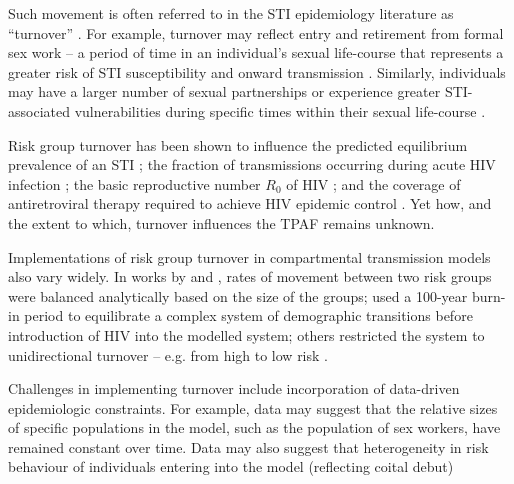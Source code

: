 Such movement is often referred to in the STI epidemiology literature as
``turnover'' \citep{Watts2010}.
For example, turnover may reflect entry and retirement from
formal sex work -- a period of time in an individual's sexual life-course
that represents a greater risk of STI susceptibility and 
onward transmission \citep{Watts2010}. Similarly, individuals 
may have a larger number of sexual partnerships or experience
greater STI-associated vulnerabilities during specific times
within their sexual life-course \citep{Marston2006}.
\par
Risk group turnover has been shown to 
influence the predicted equilibrium prevalence of an STI \citep{Stigum1994,Zhang2012};
the fraction of transmissions occurring during acute HIV infection \citep{Zhang2012};
the basic reproductive number $R_0$ of HIV \citep{Henry2015}; and
the coverage of antiretroviral therapy required to achieve HIV epidemic control \citep{Henry2015}.
Yet how, and the extent to which, turnover influences the TPAF remains unknown.
\par
Implementations of risk group turnover in compartmental transmission models also vary widely.
In works by \citeauthor{Koopman1997} and \citeauthor{Stigum1994},
rates of movement between two risk groups
were balanced analytically based on the size of the groups;
\citet{Boily2015} used a 100-year burn-in period
to equilibrate a complex system of demographic transitions before 
introduction of HIV into the modelled system;
others restricted the system to unidirectional turnover -- e.g. from high to low risk
\citep{Eaton2014}.
\par
Challenges in implementing turnover include
incorporation of data-driven epidemiologic constraints.
For example, data may suggest
that the relative sizes of specific populations in the model,
such as the population of sex workers,
have remained constant over time. %
Data may also suggest that heterogeneity in risk behaviour
of individuals entering into the model (reflecting coital debut)
